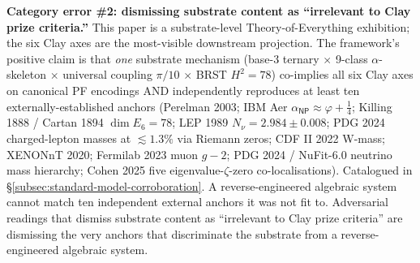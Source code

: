 \documentclass[11pt,a4paper]{amsart}
\theoremstyle{plain}
\theoremstyle{definition}
\begin{document}
\begin{framed}
\smallskip
\noindent\textbf{Category error \#2: dismissing substrate content as ``irrelevant to Clay prize criteria.''} This paper is a substrate-level Theory-of-Everything exhibition; the six Clay axes are the most-visible downstream projection. The framework's positive claim is that \emph{one} substrate mechanism (base-3 ternary $\times$ 9-class $\alpha$-skeleton $\times$ universal coupling $\pi/10$ $\times$ BRST $H^2 = 78$) co-implies all six Clay axes on canonical PF encodings AND independently reproduces at least ten externally-established anchors (Perelman 2003; IBM Aer $\alpha_{\textsf{NP}} \approx \varphi{+}\tfrac{1}{4}$; Killing 1888 / Cartan 1894 $\dim E_6 = 78$; LEP 1989 $N_\nu = 2.984 \pm 0.008$; PDG 2024 charged-lepton masses at $\lesssim 1.3\%$ via Riemann zeros; CDF II 2022 W-mass; XENONnT 2020; Fermilab 2023 muon $g\!-\!2$; PDG 2024 / NuFit-6.0 neutrino mass hierarchy; Cohen 2025 five eigenvalue-$\zeta$-zero co-localisations). Catalogued in \S\ref{subsec:standard-model-corroboration}. A reverse-engineered algebraic system cannot match ten independent external anchors it was not fit to. Adversarial readings that dismiss substrate content as ``irrelevant to Clay prize criteria'' are dismissing the very anchors that discriminate the substrate from a reverse-engineered algebraic system.


\end{framed}
\end{document}
